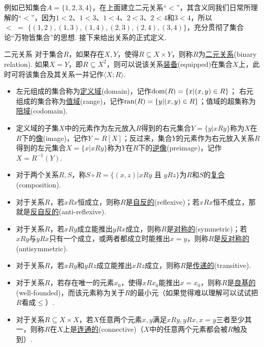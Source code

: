 例如已知集合\(A=\{1,2,3,4\}\)，在上面建立二元关系“\(<\)”，其含义同我们日常所理解的“\(<\)”，因为\(1<2\)、\(1<3\)、\(1<4\)、\(2<3\)、\(2<4\)和\(3<4\)，所以\(<\,\,=\,\,\{(1,2),(1,3),(1,4),(2,3),(2,4),(3,4)\}\)，充分贯彻了集合论“万物皆集合”的思想. 接下来给出关系的正式定义.

\begin{definition}{二元关系}
    对于集合\(R\)，如果存在\(X,Y\)，使得\(R \subseteq X \times Y\)，则称\(R\)为\underline{二元关系}(binary relation). 如果\(X = Y\)，即\(R \subseteq X^2\)，则可以说该关系\underline{装备}(equipped)在集合\(X\)上，此时可将该集合及其关系一并记作\(\langle X; R \rangle\).
    \begin{itemize}
        \item  左元组成的集合称为\underline{定义域}(domain)，记作\({\rm dom}(R)= \{x |(x,y)\in R\}\)； 右元组成的集合称为\underline{值域}(range)，记作\({\rm ran}(R)= \{y | (x,y) \in R\}\)；值域的超集称为\underline{陪域}(codomain).
        \item  定义域的子集\(X\)中的元素作为左元放入\(R\)得到的右元集合\(Y=\{y|xRy\}\)称为\(X\)在\(R\)下的\underline{像}(image)，记作\(Y=R[X]\)；反过来，集合\(Y\)的元素作为右元放入关系\(R\)得到的左元集合\(X=\{x|xRy\}\)称为\(Y\)在\(R\)下的\underline{逆像}(preimage)，记作\(X=R^{-1}(Y)\).
        \item  对于两个关系\(R,S\)，称\(S \circ R = \{(x,z) | xRy\mbox{ 且 }yRz\}\)为\(R\)和\(S\)的\underline{复合}(composition).
        \item  对于关系\(R\)，若\(xRx\)恒成立，则称\(R\)是\underline{自反的}(reflexive)；若\(xRx\)恒不成立，那就是\underline{反自反的}(anti-reflexive).
        \item  对于关系\(R\)，若\(xRy\)成立能推出\(yRx\)成立，则称\(R\)是\underline{对称的}(symmetric)；若\(xRy\)与\(yRx\)只有一个成立，或两者都成立时能推出\(x=y\)，则称\(R\)是\underline{反对称的}(antisymmetric).
        \item  对于关系\(R\)，若\(xRy\)和\(yRz\)成立能推出\(xRz\)成立，则称\(R\)是\underline{传递的}(transitive).
        \item  对于关系\(R\)，若存在唯一的元素\(x_0\)，使得\(xRx_0\)能推出\(x=x_0\)，则称\(R\)是\underline{良基的}(well-founded)，而该元素称为关于\(R\)的最小元（如果觉得难以理解可以试试把\(R\)看成\(\leq\)）.
        \item  对于关系\(R \subseteq X \times X\)，若\(X\)任意两个元素\(x,y\)满足\(xRy,yRx,x=y\)三者至少其一，则称\(R\)在\(X\)上是\underline{连通的}(connective)（\(X\)中的任意两个元素都会被\(R\)触及到）.
    \end{itemize}
\end{definition}

